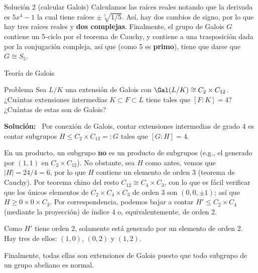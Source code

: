 \documentclass[10pt]{beamer}
\newenvironment{sol}{\textbf{Solución:}\ }{}
\begin{document}
\begin{frame}{Solución 2 (calcular Galois)}
	Calculamos las raíces reales notando que la derivada es $5x^4 - 1$ la cual tiene raíces $\pm\sqrt[5]{1/5}$.
	\pause
	Así, hay dos cambios de signo, por lo que hay tres raíces reales y \textbf{dos complejas}.
	\pause
	Finalmente, el grupo de Galois $G$ contiene un 5-ciclo por el teorema de Cauchy, y contiene a una trasposición
	dada por la conjugación compleja, así que (como 5 es \textbf{primo}), tiene que darse que $G \cong S_5$.
\end{frame}

		

\begin{frame}{Teoría de Galois}
	\small
	\begin{block}{Problema}
		Sea $L/K$ una extensión de Galois con $\Gal(L/K) \cong C_2 \times C_{12}$.
		¿Cuántas extensiones intermedias $K \subset F \subset L$ tiene tales que $[F:K] = 4$?
		¿Cuántas de estas son de Galois?
	\end{block}
	\pause
	\begin{sol}
		Por conexión de Galois, contar extensiones intermedias de grado 4 es contar subgrupos $H \le C_2 \times
		C_{12} =: G$ tales que $[G : H] = 4$.

		\pause
		\warn
		En un producto, un subgrupo \textbf{no} es un producto de subgrupos (e.g., el generado por $(1,1)$ en
		$C_2 \times C_{12}$).
		\pause
		No obstante, sea $H$ como antes, vemos que $|H| = 24/4 = 6$, por lo que $H$ contiene un elemento de
		orden 3 (teorema de Cauchy).
		\pause
		Por teorema chino del resto $C_{12} \cong C_4\times C_3$, con lo que es fácil verificar que los únicos
		elementos de $C_2 \times C_4 \times C_3$ de orden 3 son $(0, 0, \pm 1)$;
		así que $H \ge 0 \times 0 \times C_3$.
		Por correspondencia, podemos bajar a contar $H' \le C_2 \times C_4$ (mediante la proyección) de índice
		4 o, equivalentemente, de orden 2.

		\pause
		Como $H'$ tiene orden 2, solamente está generado por un elemento de orden 2.
		Hay tres de ellos: $(1, 0)$, $(0, 2)$ y $(1, 2)$.

		\pause
		Finalmente, todas ellas son extensiones de Galois puesto que todo subgrupo de un grupo abeliano es
		normal.
	\end{sol}
\end{frame}

\printbibliography
\end{document}
